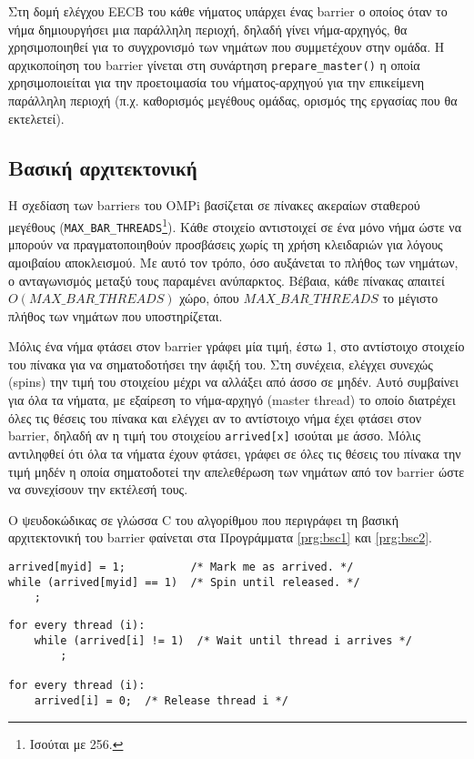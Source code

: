 Στη δομή ελέγχου EECB του κάθε νήματος υπάρχει ένας barrier ο οποίος όταν το νήμα δημιουργήσει μια παράλληλη περιοχή, δηλαδή γίνει νήμα-αρχηγός, θα χρησιμοποιηθεί για το συγχρονισμό των νημάτων που συμμετέχουν στην ομάδα. Η αρχικοποίηση του barrier γίνεται στη συνάρτηση \texttt{prepare\_master()} η οποία χρησιμοποιείται για την προετοιμασία του νήματος-αρχηγού για την επικείμενη παράλληλη περιοχή (π.χ. καθορισμός μεγέθους ομάδας, ορισμός της εργασίας που θα εκτελετεί).


\subsection{Βασική αρχιτεκτονική}
\label{ssec:Basic barrier architecture}
Η σχεδίαση των barriers του OMPi βασίζεται σε πίνακες ακεραίων σταθερού μεγέθους (\texttt{MAX\_BAR\_THREADS}\footnote{Ισούται με 256.}). Κάθε στοιχείο αντιστοιχεί σε ένα μόνο νήμα ώστε να μπορούν να πραγματοποιηθούν προσβάσεις χωρίς τη χρήση κλειδαριών για λόγους αμοιβαίου αποκλεισμού. Με αυτό τον τρόπο, όσο αυξάνεται το πλήθος των νημάτων, ο ανταγωνισμός μεταξύ τους παραμένει ανύπαρκτος. Βέβαια, κάθε πίνακας απαιτεί $O(MAX\_BAR\_THREADS)$ χώρο, όπου $MAX\_BAR\_THREADS$ το μέγιστο πλήθος των νημάτων που υποστηρίζεται.

Μόλις ένα νήμα φτάσει στον barrier γράφει μία τιμή, έστω 1, στο αντίστοιχο στοιχείο του πίνακα για να σηματοδοτήσει την άφιξή του. Στη συνέχεια, ελέγχει συνεχώς (spins) την τιμή του στοιχείου μέχρι να αλλάξει από άσσο σε μηδέν. Αυτό συμβαίνει για όλα τα νήματα, με εξαίρεση το νήμα-αρχηγό (master thread) το οποίο διατρέχει όλες τις θέσεις του πίνακα και ελέγχει αν το αντίστοιχο νήμα έχει φτάσει στον barrier, δηλαδή αν η τιμή του στοιχείου \texttt{arrived[x]} ισούται με άσσο. Μόλις αντιληφθεί ότι όλα τα νήματα έχουν φτάσει, γράφει σε όλες τις θέσεις του πίνακα την τιμή μηδέν η οποία σηματοδοτεί την απελεθέρωση των νημάτων από τον barrier ώστε να συνεχίσουν την εκτέλεσή τους.

Ο ψευδοκώδικας σε γλώσσα C του αλγορίθμου που περιγράφει τη βασική αρχιτεκτονική του barrier φαίνεται στα Προγράμματα \ref{prg:bsc1} και \ref{prg:bsc2}.

\begin{lstlisting}[label=prg:bsc1, caption=Απλός barrier για όλα τα νήματα πλην του νήματος-αρχηγού.]
arrived[myid] = 1;          /* Mark me as arrived. */
while (arrived[myid] == 1)  /* Spin until released. */
    ;
\end{lstlisting}

\begin{lstlisting}[label=prg:bsc2, caption=Απλός barrier για όλα τα νήματα πλην του νήματος-αρχηγού.]
for every thread (i):
    while (arrived[i] != 1)  /* Wait until thread i arrives */
        ;
        
for every thread (i):
    arrived[i] = 0;  /* Release thread i */
\end{lstlisting}

